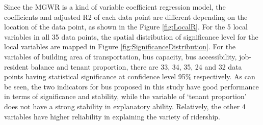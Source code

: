\documentclass[utf8]{article}
\begin{document}
%
Since the MGWR is a kind of variable coefficient regression model, the coefficients and adjusted R2 of each data point are different depending on the location of the data point, as shown in the Figure \ref{fig:LocalR}. For the 5 local variables in all 35 data points, the spatial distribution of significance level for the local variables are mapped in Figure \ref{fig:SignificanceDistribution}. For the variables of building area of transportation, bus capacity, bus accessibility, job-resident balance and tenant proportion, there are 33, 34, 35, 24 and 32 data points having statistical significance at confidence level 95\% respectively. As can be seen, the two indicators for bus proposed in this study have good performance in terms of significance and stability, while the variable of ‘tenant proportion’ does not have a strong stability in explanatory ability. Relatively, the other 4 variables have higher reliability in explaining the variety of ridership.



\end{document}
